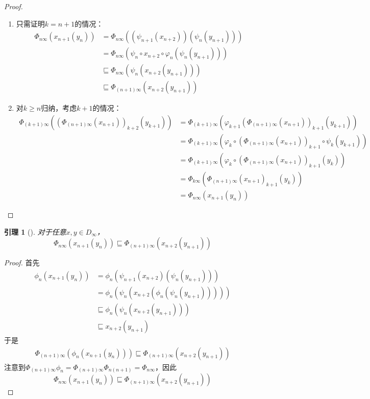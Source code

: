 \documentclass[11pt]{article}
\newtheorem{lemma}[theorem]{引理}
\begin{document}
\begin{proof}
\begin{enumerate}
\item 只需证明\(k=n+1\)的情况：
\begin{align*}
\Phi_{n\infty}(x_{n+1}(y_n))&=\Phi_{n\infty}((\psi_{n+1}(x_{n+2}))(\psi_n(y_{n+1})))\\
&=\Phi_{n\infty}(\psi_n\circ x_{n+2}\circ\varphi_n(\psi_n(y_{n+1})))\\
&\sqsubseteq\Phi_{n\infty}(\psi_n(x_{n+2}(y_{n+1})))\\
&\sqsubseteq\Phi_{(n+1)\infty}(x_{n+2}(y_{n+1}))
\end{align*}
\item 对\(k\ge n\)归纳，考虑\(k+1\)的情况：
\begin{align*}
\Phi_{(k+1)\infty}((\Phi_{(n+1)\infty}(x_{n+1}))_{k+2}(y_{k+1}))
&=\Phi_{(k+1)\infty}(\varphi_{k+1}(\Phi_{(n+1)\infty}(x_{n+1}))_{k+1}(y_{k+1}))\\
&=\Phi_{(k+1)\infty}(\varphi_k\circ(\Phi_{(n+1)\infty}(x_{n+1}))_{k+1}\circ\psi_k(y_{k+1}))\\
&=\Phi_{(k+1)\infty}(\varphi_k\circ(\Phi_{(n+1)\infty}(x_{n+1}))_{k+1}(y_k))\\
&=\Phi_{k\infty}(\Phi_{(n+1)\infty}(x_{n+1})_{k+1}(y_k))\\
&=\Phi_{n\infty}(x_{n+1}(y_n))
\end{align*}
\end{enumerate}
\end{proof}

\begin{lemma}[]
\label{16.42}
对于任意\(x,y\in D_\infty\)，
\begin{equation*}
\Phi_{n\infty}(x_{n+1}(y_n))\sqsubseteq\Phi_{(n+1)\infty}(x_{n+2}(y_{n+1}))
\end{equation*}
\end{lemma}

\begin{proof}
首先
\begin{align*}
\phi_n(x_{n+1}(y_n))&=\phi_n(\psi_{n+1}(x_{n+2})(\psi_{n}(y_{n+1})))\\
&=\phi_n(\psi_n(x_{n+2}(\phi_n(\psi_n(y_{n+1})))))\\
&\sqsubseteq\phi_n(\psi_n(x_{n+2}(y_{n+1})))\\
&\sqsubseteq x_{n+2}(y_{n+1})
\end{align*}
于是
\begin{align*}
\Phi_{(n+1)\infty}(\phi_n(x_{n+1}(y_n)))\sqsubseteq\Phi_{(n+1)\infty}(x_{n+2}(y_{n+1}))
\end{align*}
注意到\(\Phi_{(n+1)\infty}\phi_n=\Phi_{(n+1)\infty}\Phi_{n(n+1)}=\Phi_{n\infty}\)，因此
\begin{equation*}
\Phi_{n\infty}(x_{n+1}(y_n))\sqsubseteq\Phi_{(n+1)\infty}(x_{n+2}(y_{n+1}))
\end{equation*}
\end{proof}
\end{document}
